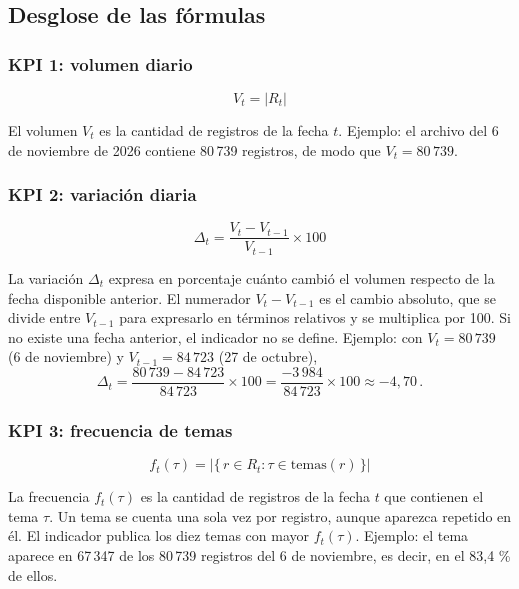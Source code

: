 \documentclass[11pt,a4paper]{article}
\newcommand{\code}[1]{\detokenize{#1}}
\begin{document}
\subsection{Desglose de las fórmulas}

\subsubsection{KPI 1: volumen diario}

\begin{equation*}
V_t = \lvert R_t \rvert
\end{equation*}

El volumen $V_t$ es la cantidad de registros de la fecha $t$. Ejemplo: el archivo del 6 de noviembre de 2026 contiene 80\,739 registros, de modo que $V_t = 80\,739$.

\subsubsection{KPI 2: variación diaria}

\begin{equation*}
\Delta_t = \frac{V_t - V_{t-1}}{V_{t-1}} \times 100
\end{equation*}

La variación $\Delta_t$ expresa en porcentaje cuánto cambió el volumen respecto de la fecha disponible anterior. El numerador $V_t - V_{t-1}$ es el cambio absoluto, que se divide entre $V_{t-1}$ para expresarlo en términos relativos y se multiplica por 100. Si no existe una fecha anterior, el indicador no se define. Ejemplo: con $V_t = 80\,739$ (6 de noviembre) y $V_{t-1} = 84\,723$ (27 de octubre),
\begin{equation*}
\Delta_t = \frac{80\,739 - 84\,723}{84\,723} \times 100 = \frac{-3\,984}{84\,723} \times 100 \approx -4{,}70\,.
\end{equation*}

\subsubsection{KPI 3: frecuencia de temas}

\begin{equation*}
f_t(\tau) = \bigl\lvert \{\, r \in R_t : \tau \in \mathrm{temas}(r) \,\} \bigr\rvert
\end{equation*}

La frecuencia $f_t(\tau)$ es la cantidad de registros de la fecha $t$ que contienen el tema $\tau$. Un tema se cuenta una sola vez por registro, aunque aparezca repetido en él. El indicador publica los diez temas con mayor $f_t(\tau)$. Ejemplo: el tema \code{TAX_FNCACT} aparece en 67\,347 de los 80\,739 registros del 6 de noviembre, es decir, en el 83,4 \% de ellos.
\end{document}

